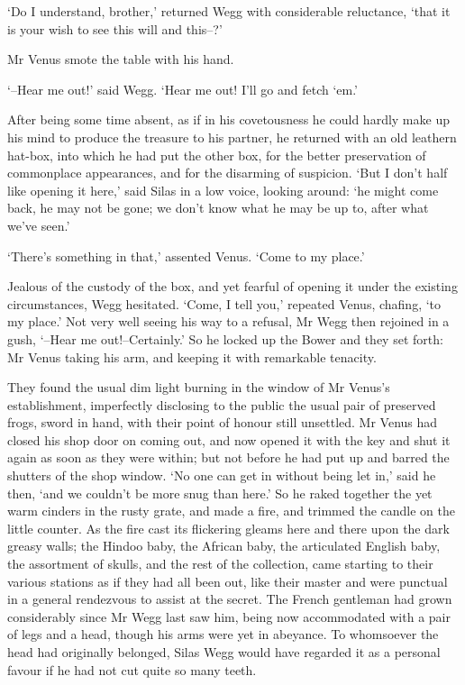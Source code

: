 ‘Do I understand, brother,’ returned Wegg with considerable reluctance,
‘that it is your wish to see this will and this--?’

Mr Venus smote the table with his hand.

‘--Hear me out!’ said Wegg. ‘Hear me out! I’ll go and fetch ‘em.’

After being some time absent, as if in his covetousness he could hardly
make up his mind to produce the treasure to his partner, he returned
with an old leathern hat-box, into which he had put the other box,
for the better preservation of commonplace appearances, and for the
disarming of suspicion. ‘But I don’t half like opening it here,’ said
Silas in a low voice, looking around: ‘he might come back, he may not be
gone; we don’t know what he may be up to, after what we’ve seen.’

‘There’s something in that,’ assented Venus. ‘Come to my place.’

Jealous of the custody of the box, and yet fearful of opening it under
the existing circumstances, Wegg hesitated. ‘Come, I tell you,’ repeated
Venus, chafing, ‘to my place.’ Not very well seeing his way to a
refusal, Mr Wegg then rejoined in a gush, ‘--Hear me out!--Certainly.’
So he locked up the Bower and they set forth: Mr Venus taking his arm,
and keeping it with remarkable tenacity.

They found the usual dim light burning in the window of Mr Venus’s
establishment, imperfectly disclosing to the public the usual pair
of preserved frogs, sword in hand, with their point of honour still
unsettled. Mr Venus had closed his shop door on coming out, and now
opened it with the key and shut it again as soon as they were within;
but not before he had put up and barred the shutters of the shop window.
‘No one can get in without being let in,’ said he then, ‘and we couldn’t
be more snug than here.’ So he raked together the yet warm cinders in
the rusty grate, and made a fire, and trimmed the candle on the little
counter. As the fire cast its flickering gleams here and there upon the
dark greasy walls; the Hindoo baby, the African baby, the articulated
English baby, the assortment of skulls, and the rest of the collection,
came starting to their various stations as if they had all been out,
like their master and were punctual in a general rendezvous to assist
at the secret. The French gentleman had grown considerably since Mr Wegg
last saw him, being now accommodated with a pair of legs and a head,
though his arms were yet in abeyance. To whomsoever the head had
originally belonged, Silas Wegg would have regarded it as a personal
favour if he had not cut quite so many teeth.

